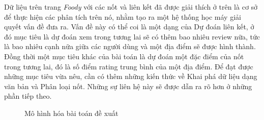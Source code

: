 \documentclass[12pt]{extarticle}
\begin{document}
			\par Dữ liệu trên trang \textit{Foody}  với các nốt và liên kết đã được giải thích ở trên là cơ sở để thực hiện các phân tích trên nó, nhằm tạo ra một hệ thống học máy giải quyết vấn đề đưa ra. Vấn đề này có thể coi là một dạng của Dự đoán liên kết, ở đó mục tiêu là dự đoán xem trong tương lai sẽ có thêm bao nhiêu review nữa, tức là bao nhiêu cạnh nữa giữa các người dùng và một địa điểm sẽ được hình thành. Đồng thời một mục tiêu khác của bài toán là dự đoán một đặc điểm của nốt trong tương lai, đó là số điểm rating trung bình của một địa điểm. Để đạt được những mục tiêu vừa nêu, cần có thêm những kiến thức về Khai phá dữ liệu dạng văn bản và Phân loại nốt. Những sự liên hệ này sẽ được dẫn ra rõ hơn ở những phần tiếp theo.

			\begin{figure}[h!]

				\caption{Mô hình hóa bài toán đề xuất}
				\label{fig:problem}
			\end{figure} 
\end{document}
